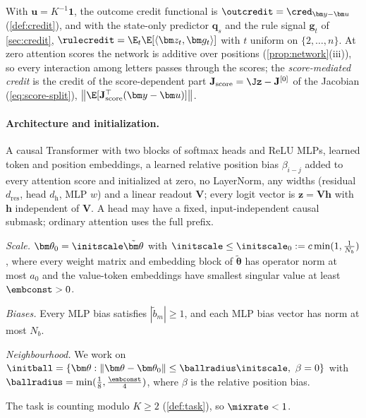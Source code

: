 With $\bm u=K^{-1}\bm 1$, the outcome credit functional is $\outcredit=\cred_{\bm y-\bm u}$ (\cref{def:credit}), and with the state-only
predictor $\bm q_s$ and the rule signal $\bm g_t$ of \cref{sec:credit}, $\rulecredit=\E_t\E[\langle\bm z_t,\bm g_t\rangle]$ with $t$ uniform on $\{2,\ldots,n\}$. At zero
attention scores the network is additive over positions (\cref{prop:network}(iii)), so every interaction among letters passes through the
scores; the \emph{score-mediated credit} is the credit of the score-dependent part $\mathbf J_{\mathrm{score}}=\Jz-\mathbf J^{[0]}$ of the Jacobian (\cref{eq:score-split}),
$\bigl\|\E[\mathbf J_{\mathrm{score}}^\top(\bm y-\bm u)]\bigr\|$.

\paragraph{Architecture and initialization.}

\begin{assumption}[Architecture]
\label{ass:arch}
A causal Transformer with two blocks of softmax heads and ReLU MLPs, learned token and position
embeddings, a learned relative position bias $\beta_{i-j}$ added to every attention score and initialized at zero, no
LayerNorm, any widths (residual $d_{\mathrm{res}}$, head $d_{\mathrm h}$, MLP $w$) and a linear readout $\mathbf V$;
every logit vector is $\bm z=\mathbf V\bm h$ with $\bm h$ independent of $\mathbf V$. A head may have a fixed, input-independent causal submask;
ordinary attention uses the full prefix.
\end{assumption}

\begin{assumption}[Initialization]
\label{ass:init}
\emph{Scale.} $\bm\theta_0=\initscale\tilde{\bm\theta}$ with $\initscale\le\initscale_0:=c\min(1,\frac{1}{N_b})$, where every weight matrix and embedding block of $\tilde{\bm\theta}$ has operator norm
at most $a_0$ and the value-token embeddings have smallest singular value at least $\embconst>0$.

\emph{Biases.} Every MLP bias satisfies $|\tilde b_m|\ge1$, and each MLP bias vector has norm at most $N_b$.

\emph{Neighbourhood.} We work on
$\initball=\{\bm\theta:\|\bm\theta-\bm\theta_0\|\le\ballradius\initscale,\ \beta=0\}$ with $\ballradius=\min(\frac{1}{8},\frac{\embconst}{4})$, where $\beta$ is the
relative position bias.
\end{assumption}

\begin{assumption}[Task]
\label{ass:task}
The task is counting modulo $K\ge2$ (\cref{def:task}), so $\mixrate<1$.
\end{assumption}

